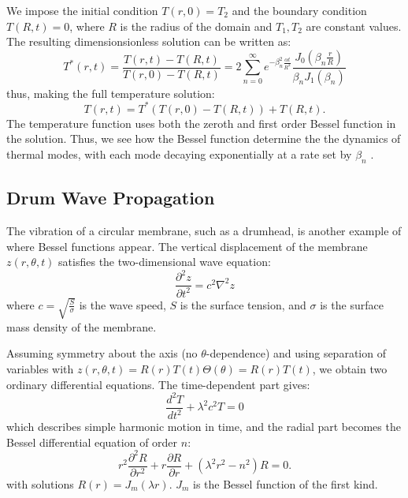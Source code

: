 \documentclass[linenumbers, twocolumn]{aastex631}
\begin{document}
\noindent We impose the initial condition $T(r,0)=T_2$ and the boundary condition
$T(R,t)=0$, where $R$ is the radius of the domain and $T_1,T_2$ are constant
values. The resulting dimensionsionless solution can be written as:
\begin{equation}
    T^*(r,t)=\frac{T(r,t)-T(R,t)}{T(r,0)-T(R,t)}=2\sum_{n=0}^\infty e^{-\beta_n^2\frac{\alpha t}{R^2}}\frac{J_0(\beta_n\frac{r}{R})}{\beta_nJ_1(\beta_n)}
\end{equation}
\noindent thus, making the full temperature solution:
\begin{equation}
    T(r,t)=T^*(T(r,0)-T(R,t))+T(R,t).
\end{equation}
\noindent The temperature function uses both the zeroth and first order
Bessel function in the solution. Thus, we see how the Bessel function determine the
the dynamics of thermal modes, with each mode decaying exponentially at a rate set
by $\beta_n$ \cite{neils}.\\


\subsection{Drum Wave Propagation}

The vibration of a circular membrane, such as a drumhead, is another example of
where Bessel functions appear. The vertical displacement of the membrane $z(r,\theta,t)$
satisfies the two-dimensional wave equation:
\begin{equation}
    \frac{\partial^2z}{\partial t^2}=c^2\nabla^2z
\end{equation}
\noindent where $c=\sqrt{\frac{S}{\sigma}}$ is the wave speed, $S$ is the surface
tension, and $\sigma$ is the surface mass density of the membrane. 

\noindent Assuming symmetry about the axis (no $\theta$-dependence) and using
separation of variables with $z(r,\theta,t)=R(r)T(t)\Theta(\theta)=R(r)T(t)$,
we obtain two ordinary differential equations. The time-dependent part gives:
\begin{equation}
    \frac{d^2T}{dt^2}+\lambda^2c^2T=0
\end{equation}
\noindent which describes simple harmonic motion in time, and the radial part
 becomes the Bessel differential equation of order $n$:
\begin{equation}
    r^2\frac{\partial^2R}{\partial r^2}+r\frac{\partial R}{\partial r}+(\lambda^2r^2-n^2)R=0.
\end{equation}
\noindent with solutions $R(r)=J_m(\lambda r)$. $J_m$ is the Bessel
function of the first kind.
\end{document}
